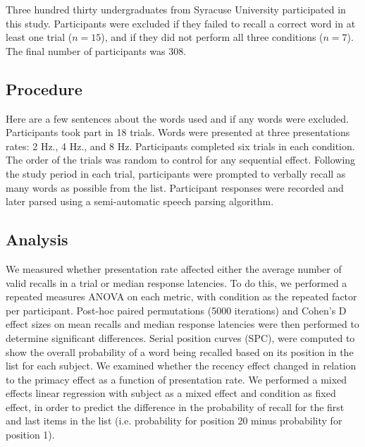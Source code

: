 \documentclass[10pt,letterpaper]{article}
\begin{document}
Three hundred thirty undergraduates from Syracuse University participated in this study.  
Participants were excluded if they failed to recall a correct word in at least one trial ($n = 15$), and if they did not perform all three conditions ($n = 7$). The final number of participants was 308.

\subsection{Procedure}

Here are a few sentences about the words used and if any words were excluded. Participants took part in 18 trials. Words were presented at three presentations rates: 2 Hz., 4 Hz., and 8 Hz. 
Participants completed six trials in each condition. The order of the trials was random to control for any sequential effect.
Following the study period in each trial, participants were prompted to verbally recall as many words as possible from the list. 
Participant responses were recorded and later parsed using a semi-automatic speech parsing algorithm.

\subsection{Analysis}

We measured whether presentation rate affected either the average number of valid recalls in a trial or median response latencies. To do this, we performed a repeated measures ANOVA on each metric, with condition as the repeated factor per participant. Post-hoc paired permutations (5000 iterations) and Cohen's D effect sizes on mean recalls and median response latencies were then performed to determine significant differences. Serial position curves (SPC), were computed to show the overall probability of a word being recalled based on its position in the list for each subject. We examined whether the recency effect changed in relation to the primacy effect as a function of presentation rate. We performed a mixed effects linear regression with subject as a mixed effect and condition as fixed effect, in order to predict the difference in the probability of recall for the first and last items in the list (i.e. probability for position 20 minus probability for position 1). 
\end{document}

